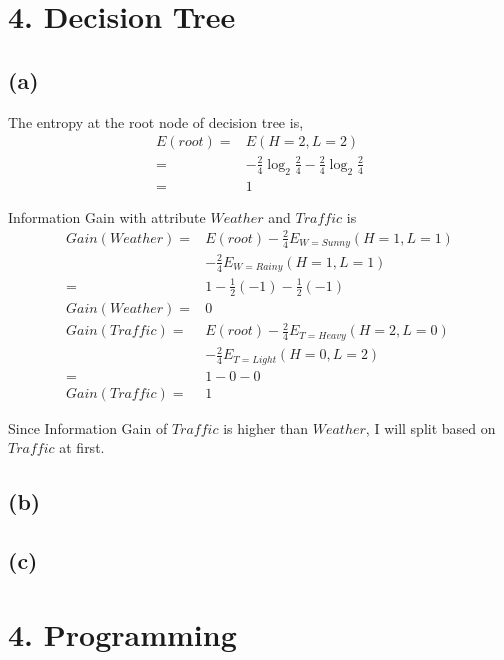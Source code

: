 \documentclass[letterpaper,doc,notimes]{apa6}
\begin{document}
\section{4. Decision Tree}
\subsection{(a)}

The entropy at the root node of decision tree is,\\
	\begin{align*}
	 E(root) = & E (H=2, L=2) \\	
	         = & -\frac{2}{4} \log_2\frac{2}{4} -\frac{2}{4} \log_2\frac{2}{4} \\
	         = & 1
	\end{align*}

Information Gain with attribute $Weather$ and $Traffic$ is
	\begin{align*}
		 Gain(Weather) = & E(root) - \frac{2}{4} E_{W=Sunny}(H=1, L=1)  \\ 
				 & - \frac{2}{4} E_{W=Rainy}(H=1, L=1) \\
				 = & 1 - \frac{1}{2} (-1) - \frac{1}{2} (-1) \\
		 Gain(Weather)	= & 0 \\
		 Gain(Traffic) = & E(root) - \frac{2}{4} E_{T=Heavy}(H=2, L=0) \\ & - \frac{2}{4} E_{T=Light}(H=0, L=2) \\
 		  = & 1 - 0 - 0 \\
		 Gain(Traffic) = & 1
	\end{align*}

Since Information Gain of $Traffic$ is higher than $Weather$, I will split based on $Traffic$ at first.

\subsection{(b)}
\subsection{(c)}

\section{4. Programming}
\end{document}
